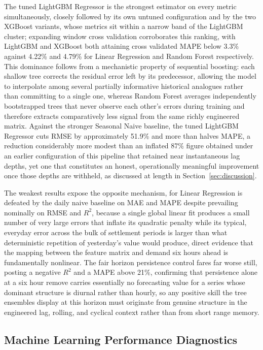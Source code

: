 \documentclass[runningheads]{llncs}
\begin{document}
The tuned LightGBM Regressor is the strongest estimator on every metric simultaneously, closely followed by its own untuned configuration and by the two XGBoost variants, whose metrics sit within a narrow band of the LightGBM cluster; expanding window cross validation corroborates this ranking, with LightGBM and XGBoost both attaining cross validated MAPE below 3.3\% against 4.22\% and 4.79\% for Linear Regression and Random Forest respectively. This dominance follows from a mechanistic property of sequential boosting: each shallow tree corrects the residual error left by its predecessor, allowing the model to interpolate among several partially informative historical analogues rather than committing to a single one, whereas Random Forest averages independently bootstrapped trees that never observe each other's errors during training and therefore extracts comparatively less signal from the same richly engineered matrix. Against the stronger Seasonal Naive baseline, the tuned LightGBM Regressor cuts RMSE by approximately 51.9\% and more than halves MAPE, a reduction considerably more modest than an inflated 87\% figure obtained under an earlier configuration of this pipeline that retained near instantaneous lag depths, yet one that constitutes an honest, operationally meaningful improvement once those depths are withheld, as discussed at length in Section~\ref{sec:discussion}.

The weakest results expose the opposite mechanism, for Linear Regression is defeated by the daily naive baseline on MAE and MAPE despite prevailing nominally on RMSE and $R^2$, because a single global linear fit produces a small number of very large errors that inflate its quadratic penalty while its typical, everyday error across the bulk of settlement periods is larger than what deterministic repetition of yesterday's value would produce, direct evidence that the mapping between the feature matrix and demand six hours ahead is fundamentally nonlinear. The fair horizon persistence control fares far worse still, posting a negative $R^2$ and a MAPE above 21\%, confirming that persistence alone at a six hour remove carries essentially no forecasting value for a series whose dominant structure is diurnal rather than hourly, so any positive skill the tree ensembles display at this horizon must originate from genuine structure in the engineered lag, rolling, and cyclical context rather than from short range memory.

\subsection{Machine Learning Performance Diagnostics}
\label{sec:mlperf}
\end{document}
